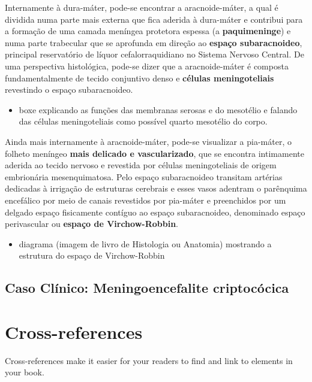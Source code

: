 \documentclass[
]{book}
\providecommand{\tightlist}{%
  \setlength{\itemsep}{0pt}\setlength{\parskip}{0pt}}
\theoremstyle{definition}
\theoremstyle{definition}
\theoremstyle{definition}
\theoremstyle{definition}
\theoremstyle{remark}
\begin{document}
Internamente à dura-máter, pode-se encontrar a aracnoide-máter, a qual é dividida numa parte mais externa que fica aderida à dura-máter e contribui para a formação de uma camada meníngea protetora espessa (a \textbf{paquimeninge}) e numa parte trabecular que se aprofunda em direção ao \textbf{espaço subaracnoideo}, principal reservatório de líquor cefalorraquidiano no Sistema Nervoso Central. De uma perspectiva histológica, pode-se dizer que a aracnoide-máter é composta fundamentalmente de tecido conjuntivo denso e \textbf{células meningoteliais} revestindo o espaço subaracnoideo.

\begin{itemize}
\tightlist
\item
  boxe explicando as funções das membranas serosas e do mesotélio e falando das células meningoteliais como possível quarto mesotélio do corpo.
\end{itemize}

Ainda mais internamente à aracnoide-máter, pode-se visualizar a pia-máter, o folheto meníngeo \textbf{mais delicado e vascularizado}, que se encontra intimamente aderida ao tecido nervoso e revestida por células meningoteliais de origem embrionária mesenquimatosa. Pelo espaço subaracnoideo transitam artérias dedicadas à irrigação de estruturas cerebrais e esses vasos adentram o parênquima encefálico por meio de canais revestidos por pia-máter e preenchidos por um delgado espaço fisicamente contíguo ao espaço subaracnoideo, denominado espaço perivascular ou \textbf{espaço de Virchow-Robbin}.

\begin{itemize}
\tightlist
\item
  diagrama (imagem de livro de Histologia ou Anatomia) mostrando a estrutura do espaço de Virchow-Robbin
\end{itemize}

\hypertarget{caso-cluxednico-meningoencefalite-criptocuxf3cica}{%
\section{Caso Clínico: Meningoencefalite criptocócica}\label{caso-cluxednico-meningoencefalite-criptocuxf3cica}}

\hypertarget{cross}{%
\chapter{Cross-references}\label{cross}}

Cross-references make it easier for your readers to find and link to elements in your book.
\end{document}
